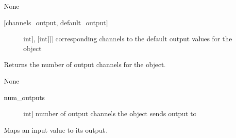 \documentclass[letterpaper,10pt,english]{sphinxmanual}
\begin{document}
\begin{fulllineitems}
\begin{fulllineitems}
\sphinxAtStartPar
{}

\sphinxAtStartPar
None

\sphinxAtStartPar
{}
\begin{description}
\item[{{[}channels\_output, default\_output{]}}] \leavevmode{[}{[}{[}int{]}, {[}int{]}{]}{]}
\sphinxAtStartPar
corresponding channels to the default output values for the object

\end{description}

\end{fulllineitems}


\begin{fulllineitems}
\label{\detokenize{base:MultiInputOutputObject.MultiInputOutputObject.get_num_channels}}
\sphinxAtStartPar
Returns the number of output channels for the object.

\sphinxAtStartPar
{}

\sphinxAtStartPar
None

\sphinxAtStartPar
{}
\begin{description}
\item[{num\_outputs}] \leavevmode{[}int{]}
\sphinxAtStartPar
number of output channels the object sends output to

\end{description}

\end{fulllineitems}


\begin{fulllineitems}
\label{\detokenize{base:MultiInputOutputObject.MultiInputOutputObject.map_values}}
\sphinxAtStartPar
Maps an input value to its output.


\end{fulllineitems}
\end{fulllineitems}
\end{document}
